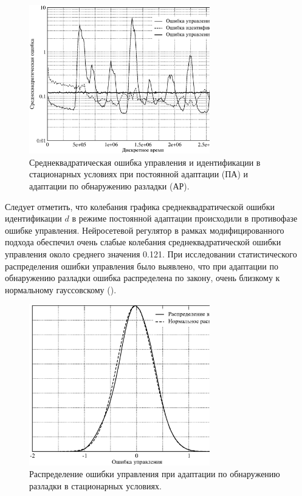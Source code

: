 \begin{figure}[h]
\centering
\includegraphics[width=0.7\textwidth,%
  totalheight=0.3\textheight]{perm_adopt_steady_plant_rus}
\caption{Среднеквадратическая ошибка управления и идентификации в
  стационарных условиях при постоянной адаптации (ПА) и адаптации по
  обнаружению разладки (АР).}
\label{fig:steady_plant_errors}
\end{figure}

Следует отметить, что колебания графика среднеквадратической ошибки
идентификации $d$ в режиме постоянной адаптации происходили в
противофазе ошибке управления.  Нейросетевой регулятор в рамках
модифицированного подхода обеспечил очень слабые колебания
среднеквадратической ошибки управления около среднего значения 0.121.
При исследовании статистического распределения ошибки управления было
выявлено, что при адаптации по обнаружению разладки ошибка
распределена по закону, очень близкому к нормальному гауссовскому
().

\begin{figure}[h]
\centering
\includegraphics[width=0.7\textwidth,%
  totalheight=0.3\textheight]{modif_apr_distrib_rus}
\caption{Распределение ошибки управления при адаптации по обнаружению
  разладки в стационарных условиях.}
\label{fig:modif_apr_distrib_rus}
\end{figure}

